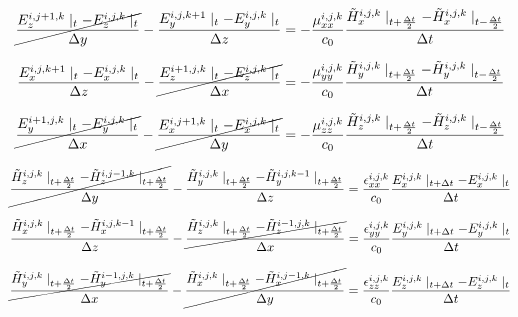 \documentclass[a4paper,10pt]{article}
\begin{document}
\begin{equation*}
  \cancel{\frac{E_{z}^{i,j+1,k}\mid_{t} - E_{z}^{i,j,k}\mid_{t}}{\Delta y}} - \frac{E_{y}^{i,j,k+1}\mid_{t} - E_{y}^{i,j,k}\mid_{t}}{\Delta z} = -\frac{\mu_{xx}^{i,j,k}}{c_0} \frac{\tilde{H}_{x}^{i,j,k}\mid_{t+\frac  {\Delta t}{2}} - \tilde{H}_{x}^{i,j,k}\mid_{t-\frac{\Delta t}{2}}}{\Delta t}\notag
\end{equation*}

\begin{equation*}
  \frac{E_{x}^{i,j,k+1}\mid_{t} - E_{x}^{i,j,k}\mid_{t}}{\Delta z} - \cancel{\frac{E_{z}^{i+1,j,k}\mid_{t} - E_{z}^{i,j,k}\mid_{t}}{\Delta x}} = -\frac{\mu_{yy}^{i,j,k}}{c_0} \frac{\tilde{H}_{y}^{i,j,k}\mid_{t+\frac  {\Delta t}{2}} - \tilde{H}_{y}^{i,j,k}\mid_{t-\frac{\Delta t}{2}}}{\Delta t}\notag
\end{equation*}

\begin{equation*}
  \cancel{\frac{E_{y}^{i+1,j,k}\mid_{t} - E_{y}^{i,j,k}\mid_{t}}{\Delta x}} - \cancel{\frac{E_{x}^{i,j+1,k}\mid_{t} - E_{x}^{i,j,k}\mid_{t}}{\Delta y}} = -\frac{\mu_{zz}^{i,j,k}}{c_0} \frac{\tilde{H}_{z}^{i,j,k}\mid_{t+\frac  {\Delta t}{2}} - \tilde{H}_{z}^{i,j,k}\mid_{t-\frac{\Delta t}{2}}}{\Delta t}\notag
\end{equation*}

\begin{equation*}
  \cancel{\frac{\tilde{H}_{z}^{i,j,k}\mid_{t+\frac{\Delta t}{2}} - \tilde{H}_{z}^{i,j-1,k}\mid_{t+\frac  {\Delta t}{2}}}{\Delta y}} - \frac{\tilde{H}_{y}^{i,j,k}\mid_{t+\frac  {\Delta t}{2}} - \tilde{H}_{y}^{i,j,k-1}\mid_{t+\frac  {\Delta t}{2}}}{\Delta z} = \frac{\epsilon_{xx}^{i,j,k}}{c_0} \frac{E_{x}^{i,j,k}\mid_{t+\Delta t} - E_{x}^{i,j,k}\mid_{t}}{\Delta t}\notag
\end{equation*}

\begin{equation*}
  \frac{\tilde{H}_{x}^{i,j,k}\mid_{t+\frac{\Delta t}{2}} - \tilde{H}_{x}^{i,j,k-1}\mid_{t+\frac  {\Delta t}{2}}}{\Delta z} - \cancel{\frac{\tilde{H}_{z}^{i,j,k}\mid_{t+\frac  {\Delta t}{2}} - \tilde{H}_{z}^{i-1,j,k}\mid_{t+\frac  {\Delta t}{2}}}{\Delta x}} = \frac{\epsilon_{yy}^{i,j,k}}{c_0} \frac{E_{y}^{i,j,k}\mid_{t+\Delta t} - E_{y}^{i,j,k}\mid_{t}}{\Delta t}\notag
\end{equation*}

\begin{equation*}
  \cancel{\frac{\tilde{H}_{y}^{i,j,k}\mid_{t+\frac{\Delta t}{2}} - \tilde{H}_{y}^{i-1,j,k}\mid_{t+\frac  {\Delta t}{2}}}{\Delta x}} - \cancel{\frac{\tilde{H}_{x}^{i,j,k}\mid_{t+\frac  {\Delta t}{2}} - \tilde{H}_{x}^{i,j-1,k}\mid_{t+\frac  {\Delta t}{2}}}{\Delta y}} = \frac{\epsilon_{zz}^{i,j,k}}{c_0} \frac{E_{z}^{i,j,k}\mid_{t+\Delta t} - E_{z}^{i,j,k}\mid_{t}}{\Delta t}\notag
\end{equation*}
\end{document}
